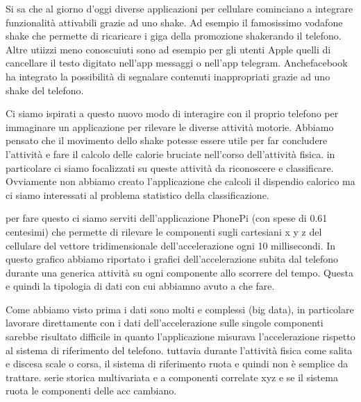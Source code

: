 \documentclass{report}
\begin{document}
%
Si sa che al giorno d\rq{}oggi diverse applicazioni per cellulare cominciano a integrare funzionalità attivabili grazie ad uno shake. Ad esempio il famosissimo vodafone shake che permette di ricaricare i giga della promozione shakerando il telefono. Altre utiizzi meno conoscuiuti sono ad esempio per gli utenti Apple quelli di cancellare il testo digitato nell\rq{}app messaggi o nell\rq{}app telegram. Anchefacebook ha integrato la 
possibilità di segnalare contenuti inappropriati grazie ad uno shake del telefono.
%

%
Ci siamo ispirati a questo nuovo modo di interagire con il proprio telefono per immaginare un applicazione per rilevare le diverse attività motorie. Abbiamo pensato che il movimento dello shake potesse essere utile per far concludere l\rq{}attività e fare il calcolo delle calorie bruciate nell\rq{}corso dell\rq{}attività fisica.
in particolare ci siamo focalizzati su queste attività da riconoscere e classificare.
Ovviamente non abbiamo creato l\rq{}applicazione che calcoli il dispendio calorico ma ci siamo interessati al problema statistico della classificazione. 
%

%
per fare questo ci siamo serviti dell\rq{}applicazione PhonePi (con spese di 0.61 centesimi)  che permette di rilevare le componenti sugli cartesiani x y z del cellulare del vettore tridimensionale dell\rq{}accelerazione ogni 10 millisecondi.
In questo grafico abbiamo riportato i grafici dell\rq{}accelerazione subita dal telefono durante una generica attività su ogni componente allo scorrere del tempo. 
Questa e quindi la tipologia di dati con cui abbiamno avuto a che fare. 
%

%
Come abbiamo visto prima i dati sono molti e complessi (big data), in particolare lavorare direttamente con i dati dell\rq{}accelerazione sulle singole componenti sarebbe risultato difficile in quanto l\rq{}applicazione misurava l\rq{}accelerazione rispetto al sistema di riferimento del telefono. tuttavia durante l\rq{}attività fisica come salita e discesa scale o corsa, il sistema di riferimento ruota e quindi non è semplice da trattare. serie storica multivariata e a componenti correlate xyz e se il sistema ruota le componenti delle acc cambiano.
%
\end{document}
